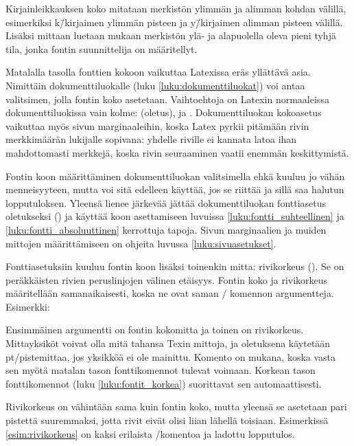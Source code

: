 Kirjainleikkauksen koko mitataan merkistön ylimmän ja alimman kohdan
välillä, esimerkiksi k\=/kirjaimen ylimmän pisteen ja y\=/kirjaimen
alimman pisteen välillä. Lisäksi mittaan luetaan mukaan merkistön ylä-
ja alapuolella oleva pieni tyhjä tila, jonka fontin suunnittelija on
määritellyt.

Matalalla tasolla fonttien kokoon vaikuttaa Latexissa eräs yllättävä
asia. Nimittäin dokumenttiluokalle (luku \ref{luku:dokumenttiluokat})
voi antaa valitsimen, jolla fontin koko asetetaan. Vaihtoehtoja on
Latexin normaaleissa dokumenttiluokissa vain kolme: \koodi{10pt}
(oletus), \koodi{11pt} ja \koodi{12pt}. Dokumenttiluokan kokoasetus
vaikuttaa myös sivun marginaaleihin, koska Latex pyrkii pitämään rivin
merkkimäärän lukijalle sopivana: yhdelle riville ei kannata latoa ihan
mahdottomasti merkkejä, koska rivin seuraaminen vaatii enemmän
keskittymistä.

Fontin koon määrittäminen dokumenttiluokan valitsimella ehkä kuuluu jo
vähän menneisyyteen, mutta voi sitä edelleen käyttää, jos se riittää ja
sillä saa halutun lopputuloksen. Yleensä lienee järkevää jättää
dokumenttiluokan fonttiasetus oletukseksi (\koodi{10pt}) ja käyttää koon
asettamiseen luvuissa \ref{luku:fontti_suhteellinen} ja
\ref{luku:fontti_absoluuttinen} kerrottuja tapoja. Sivun marginaalien ja
muiden mittojen määrittämiseen on ohjeita luvussa
\ref{luku:sivuasetukset}.

Fonttiasetuksiin kuuluu fontin koon lisäksi toinenkin mitta: rivikorkeus
(). Se on peräkkäisten rivien peruslinjojen välinen
etäisyys. Fontin koko ja rivikorkeus määritellään samanaikaisesti, koska
ne ovat saman \-/ komennon argumentteja. Esimerkki:

\begin{koodilohkosis}
\fontsize{10bp}{12bp} \selectfont
\end{koodilohkosis}

Ensimmäinen argumentti on fontin kokomitta ja toinen on rivikorkeus.
Mittayksiköt voivat olla mitä tahansa Texin mittoja, ja oletuksena
käytetään pt\-/pistemittaa, jos yksikköä ei ole mainittu. Komento
 on mukana, koska vasta sen myötä matalan tason
fonttikomennot tulevat voimaan. Korkean tason fonttikomennot (luku
\ref{luku:fontit_korkea}) suorittavat sen automaattisesti.

Rivikorkeus on vähintään sama kuin fontin koko, mutta yleensä se
asetetaan pari pistettä suuremmaksi, jotta rivit eivät olisi liian
lähellä toisiaan. Esimerkissä \ref{esim:rivikorkeus} on kaksi erilaista
\-/komentoa ja ladottu lopputulos.

